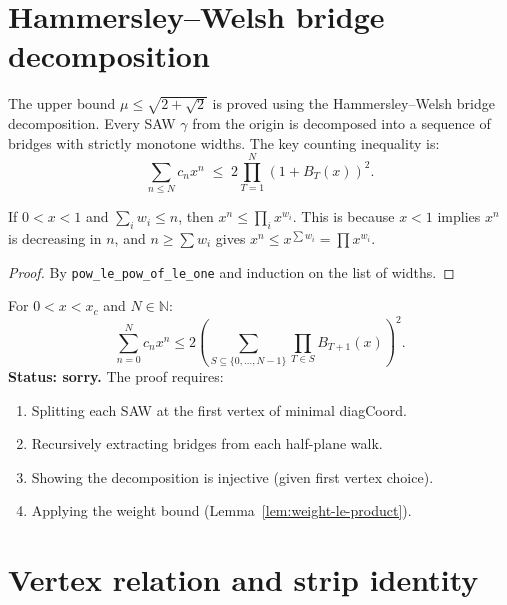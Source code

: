 \begin{lemma}
\begin{enumerate}
\section{Hammersley--Welsh bridge decomposition}\label{sec:hw-decomp}

The upper bound $\mu \leq \sqrt{2+\sqrt{2}}$ is proved using the
Hammersley--Welsh bridge decomposition. Every SAW $\gamma$ from the
origin is decomposed into a sequence of bridges with strictly
monotone widths. The key counting inequality is:
\[
  \sum_{n \leq N} c_n x^n \;\leq\; 2 \prod_{T=1}^{N} (1 + B_T(x))^2.
\]

\begin{lemma}\label{lem:weight-le-product}
\leanok
  If $0 < x < 1$ and $\sum_i w_i \leq n$, then
  $x^n \leq \prod_i x^{w_i}$.
  This is because $x < 1$ implies $x^n$ is decreasing in $n$,
  and $n \geq \sum w_i$ gives $x^n \leq x^{\sum w_i} = \prod x^{w_i}$.
\end{lemma}
\begin{proof}\leanok
  By \texttt{pow\_le\_pow\_of\_le\_one} and induction on the list of widths.
\end{proof}

\begin{theorem}\label{thm:hw-counting}
  For $0 < x < x_c$ and $N \in \mathbb{N}$:
  \[
    \sum_{n=0}^{N} c_n x^n \leq 2 \left(\sum_{S \subseteq \{0,\ldots,N-1\}}
    \prod_{T \in S} B_{T+1}(x)\right)^2.
  \]
  \textbf{Status: sorry.} The proof requires:
  \begin{enumerate}
    \item Splitting each SAW at the first vertex of minimal diagCoord.
    \item Recursively extracting bridges from each half-plane walk.
    \item Showing the decomposition is injective (given first vertex choice).
    \item Applying the weight bound (Lemma~\ref{lem:weight-le-product}).
  \end{enumerate}
\end{theorem}

\section{Vertex relation and strip identity}\label{sec:vertex-strip}


\end{enumerate}
\end{lemma}
